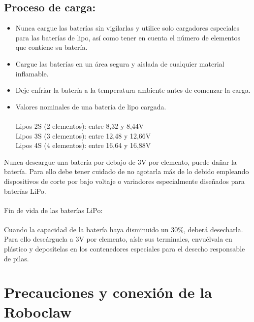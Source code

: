 \documentclass[user_manual.tex]{subfiles}
\begin{document}
\subsection{Proceso de carga:}
\begin{itemize}
 \item  Nunca cargue las baterías sin vigilarlas y utilice solo cargadores especiales para las baterías de lipo, así como tener
    en cuenta el número de elementos que contiene su batería.
 \item Cargue las baterías en un área segura y aislada de cualquier material inflamable.
 \item Deje enfriar la batería a la temperatura ambiente antes de comenzar la carga.
 \item Valores nominales de una batería de lipo cargada.\\
 \\
    Lipos 2S (2 elementos): entre 8,32 y 8,44V\\
    Lipos 3S (3 elementos): entre 12,48 y 12,66V\\
    Lipos 4S (4 elementos): entre 16,64 y 16,88V\\
\end{itemize}   

Nunca descargue una batería por debajo de 3V por elemento, puede dañar la batería. Para ello debe tener cuidado de no 
agotarla más de lo debido empleando dispositivos de corte por bajo voltaje o variadores especialmente diseñados para 
baterías LiPo.\\
\\
Fin de vida de las baterías LiPo:\\
\\
Cuando la capacidad de la batería haya disminuido un 30\%, deberá desecharla. Para ello descárguela a 3V por elemento, 
aísle sus terminales, envuélvala en plástico y deposítelas en los contenedores especiales para el desecho responsable de 
pilas.\\

\section{Precauciones y conexión de la Roboclaw}
\end{document}
